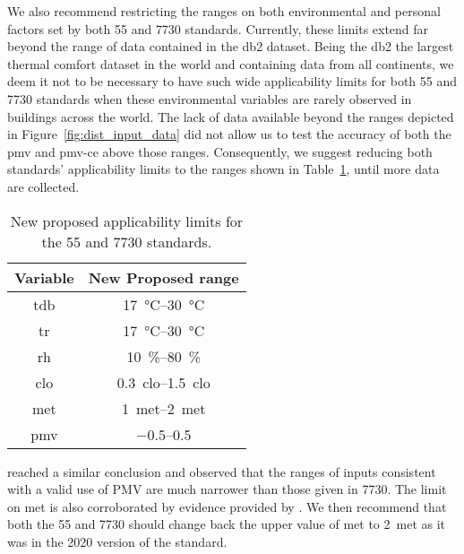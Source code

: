 We also recommend restricting the ranges on both environmental and personal factors set by both \gls{55} and \gls{7730} standards.
Currently, these limits extend far beyond the range of data contained in the \ac{db2} dataset.
Being the \ac{db2} the largest thermal comfort dataset in the world and containing data from all continents, we deem it not to be necessary to have such wide applicability limits for both \gls{55} and \gls{7730} standards when these environmental variables are rarely observed in buildings across the world.
The lack of data available beyond the ranges depicted in Figure~\ref{fig:dist_input_data} did not allow us to test the accuracy of both the \ac{pmv} and \ac{pmv-ce} above those ranges.
Consequently, we suggest reducing both standards' applicability limits to the ranges shown in Table~\ref{tab:ranges}, until more data are collected.
\begin{table}[htb!]
    \centering
    \begin{tabular}{cc}
        \toprule
        Variable & New Proposed range \\
        \midrule
        \ac{tdb} & \qtyrange{17}{30}{\celsius} \\
        \ac{tr} & \qtyrange{17}{30}{\celsius} \\
        \ac{rh} & \qtyrange{10}{80}{\percent} \\
        \ac{clo} & \qtyrange{0.3}{1.5}{clo} \\
        \ac{met} & \qtyrange{1}{2}{met} \\
        \ac{pmv} & \numrange{-.5}{.5}{} \\
        \bottomrule
    \end{tabular}
    \caption{New proposed applicability limits for the \gls{55} and \gls{7730} standards.}
    \label{tab:ranges}
\end{table}
 reached a similar conclusion and observed that the ranges of inputs consistent with a valid use of PMV are much narrower than those given in \gls{7730}.
The limit on \ac{met} is also corroborated by evidence provided by .
We then recommend that both the \gls{55} and \gls{7730} should change back the upper value of \ac{met} to \qty{2}{met} as it was in the 2020 version of the standard.


